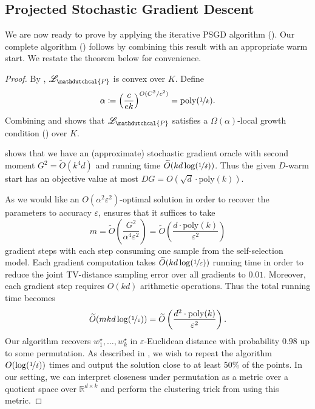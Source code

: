 \documentclass[11pt,letterpaper]{article}
\theoremstyle{plain}
\theoremstyle{definition}
\theoremstyle{remark}
\newcommand{\inparen}[1]{\ensuremath{\left(#1\right)}}
\newcommand{\R}{\mathbb{R}}
\newcommand{\nfrac}[2]{\nicefrac{#1}{#2}}
\newcommand{\poly}{\mathrm{poly}}
\newcommand{\eps}{\varepsilon}
\renewcommand{\tilde}{\widetilde}
\newcommand{\negLL}{\ensuremath{\mathscr{L}}}
\newcommand{\hypo}[1]{\mathdutchcal{#1}}
\newcommand{\hyP}{\hypo{P}}
\begin{document}
{{        

    
\subsection{Projected Stochastic Gradient Descent}
    We are now ready to prove  by applying the iterative PSGD algorithm ().
    Our complete algorithm () follows by combining this result with an appropriate warm start.
    We restate the theorem below for convenience.
    \thmSelfSelectionLocalConvergence*

    \begin{proof}
        By ,
        $\negLL_\hyP$ is convex over $K$.
        Define
        \[
            \alpha \coloneqq \inparen{\frac{c}{ek}}^{O(C^2/c^2)} = \poly(\nfrac1k).
        \]
        Combining  and 
        shows that $\negLL_\hyP$ satisfies a $\Omega(\alpha)$-local growth condition () over $K$. 

         shows that
        we have an (approximate) stochastic gradient oracle
        with second moment $G^2 = \tilde O(k^4d)$ and running time $\tilde O(kd \log(\nfrac1\delta))$.
        Thus the given $D$-warm start has an objective value at most $DG = O(\sqrt{d}\cdot \poly(k))$.

        As we would like an $O(\alpha^2\eps^2)$-optimal solution in order to recover the parameters to accuracy $\eps$,
         ensures that it suffices to take
        \[
            m = \tilde O\inparen{\frac{G^2}{\alpha^4 \eps^2}}
            = \tilde O\inparen{\frac{d\cdot \poly(k)}{\eps^2}}
        \]
        gradient steps with each step consuming one sample from the self-selection model.
        Each gradient computation takes $\tilde O(kd\log(\nfrac1\eps))$ running time 
        in order to reduce the joint TV-distance sampling error over all gradients to $0.01$.
        Moreover,
        each gradient step requires $O(kd)$ arithmetic operations.
        Thus the total running time becomes
        \[
            \tilde O(mkd \log(\nfrac1\eps))
            = \tilde O\inparen{\frac{d^2\cdot \poly(k)}{\eps^2}}.
        \] 
        Our algorithm recovers $w_1^\star, \dots, w_k^\star$ in $\eps$-Euclidean distance with probability $0.98$ up to some permutation.
        As described in ,
        we wish to repeat the algorithm $O(\log(\nfrac1\delta))$ times and output the solution close to at least 50\% of the points.
        In our setting,
        we can interpret closeness under permutation as a metric over a quotient space over $\R^{d\times k}$
        and perform the clustering trick from  using this metric.
    \end{proof}

}}
\end{document}
